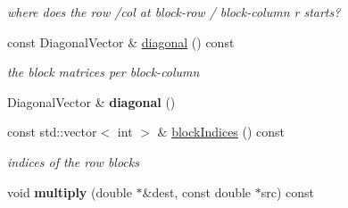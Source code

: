 \begin{DoxyCompactItemize}
\begin{DoxyCompactList}\small\item\em where does the row /col at block-\/row / block-\/column r starts? \end{DoxyCompactList}\item 
\hypertarget{classg2o_1_1SparseBlockMatrixDiagonal_a762097ac116728fec0cc64cf05610a96}{const Diagonal\-Vector \& \hyperlink{classg2o_1_1SparseBlockMatrixDiagonal_a762097ac116728fec0cc64cf05610a96}{diagonal} () const }\label{classg2o_1_1SparseBlockMatrixDiagonal_a762097ac116728fec0cc64cf05610a96}

\begin{DoxyCompactList}\small\item\em the block matrices per block-\/column \end{DoxyCompactList}\item 
\hypertarget{classg2o_1_1SparseBlockMatrixDiagonal_af75593896065195f7dc2342132c565cc}{Diagonal\-Vector \& {\bfseries diagonal} ()}\label{classg2o_1_1SparseBlockMatrixDiagonal_af75593896065195f7dc2342132c565cc}

\item 
\hypertarget{classg2o_1_1SparseBlockMatrixDiagonal_acac6778f21aea2355fccad48de1c6f08}{const std\-::vector$<$ int $>$ \& \hyperlink{classg2o_1_1SparseBlockMatrixDiagonal_acac6778f21aea2355fccad48de1c6f08}{block\-Indices} () const }\label{classg2o_1_1SparseBlockMatrixDiagonal_acac6778f21aea2355fccad48de1c6f08}

\begin{DoxyCompactList}\small\item\em indices of the row blocks \end{DoxyCompactList}\item 
\hypertarget{classg2o_1_1SparseBlockMatrixDiagonal_a3b6da3a28659e6b86410885ce7297ce2}{void {\bfseries multiply} (double $\ast$\&dest, const double $\ast$src) const }\label{classg2o_1_1SparseBlockMatrixDiagonal_a3b6da3a28659e6b86410885ce7297ce2}

\end{DoxyCompactItemize}
